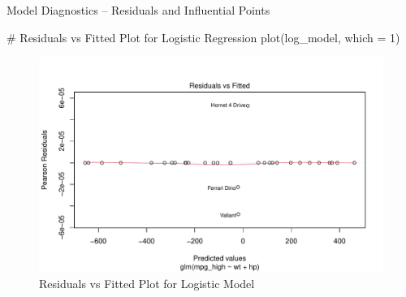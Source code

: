 \documentclass[
  18 pt,
  ignorenonframetext,
  aspectratio=1610,
]{beamer}
\newenvironment{Shaded}{\begin{snugshade}}{\end{snugshade}}
\newcommand{\AttributeTok}[1]{\textcolor[rgb]{0.40,0.45,0.13}{#1}}
\newcommand{\CommentTok}[1]{\textcolor[rgb]{0.37,0.37,0.37}{#1}}
\newcommand{\DecValTok}[1]{\textcolor[rgb]{0.68,0.00,0.00}{#1}}
\newcommand{\FunctionTok}[1]{\textcolor[rgb]{0.28,0.35,0.67}{#1}}
\newcommand{\NormalTok}[1]{\textcolor[rgb]{0.00,0.23,0.31}{#1}}
\begin{document}
\begin{frame}[fragile]{Model Diagnostics -- Residuals and Influential
Points}
\protect\hypertarget{model-diagnostics-residuals-and-influential-points-1}{}
\tiny

\begin{Shaded}
\begin{Highlighting}[]
\CommentTok{\# Residuals vs Fitted Plot for Logistic Regression}
\FunctionTok{plot}\NormalTok{(log\_model, }\AttributeTok{which =} \DecValTok{1}\NormalTok{)}
\end{Highlighting}
\end{Shaded}

\begin{figure}

{\centering \includegraphics[width=\textwidth,height=0.5\textheight]{R-Regression_files/figure-beamer/unnamed-chunk-35-1.pdf}

}

\caption{Residuals vs Fitted Plot for Logistic Model}

\end{figure}
\end{frame}
\end{document}
